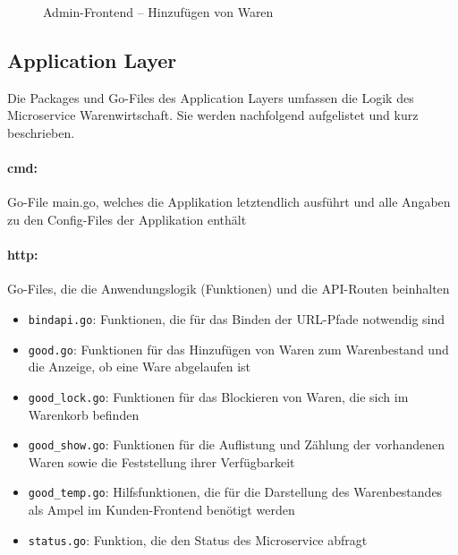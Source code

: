 \begin{figure}[H]
	\centering
	\caption{Admin-Frontend -- Hinzufügen von Waren}
	\label{pic:Admin-Frontend -- Hinzufuegen von Waren}
\end{figure}


\newpage
\subsection{Application Layer}
\label{subsec: Application Layer}
Die Packages und Go-Files des Application Layers umfassen die Logik des Microservice Warenwirtschaft. Sie werden nachfolgend aufgelistet und kurz beschrieben.

\paragraph{cmd:} Go-File main.go, welches die Applikation letztendlich ausführt und alle Angaben zu den Config-Files der Applikation enthält

\paragraph{http:} Go-Files, die die Anwendungslogik (Funktionen) und die API-Routen beinhalten
	\begin{itemize}
	\item \texttt{bindapi.go}: Funktionen, die für das Binden der URL-Pfade notwendig sind
	\item \texttt{good.go}: Funktionen für das Hinzufügen von Waren zum Warenbestand und die Anzeige, ob eine Ware abgelaufen ist
	\item \texttt{good\_lock.go}: Funktionen für das Blockieren von Waren, die sich im Warenkorb befinden
		\item \texttt{good\_show.go}: Funktionen für die Auflistung und Zählung der vorhandenen Waren sowie die Feststellung ihrer Verfügbarkeit
	\item \texttt{good\_temp.go}: Hilfsfunktionen, die für die Darstellung des Warenbestandes als Ampel im Kunden-Frontend benötigt werden
	\item \texttt{status.go}: Funktion, die den Status des Microservice abfragt
	\end{itemize}


